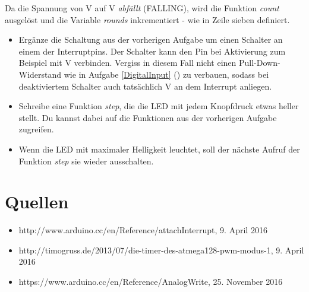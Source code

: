 \documentclass[10pt,a4paper]{article}
\begin{document}
Da die Spannung von \unit[5]{V} auf \unit[0]{V} \emph{abfällt} (FALLING), wird die Funktion \emph{count} ausgelöst und die Variable \emph{rounds} inkrementiert - wie in Zeile sieben definiert.

\begin{itemize}
	\item Ergänze die Schaltung aus der vorherigen Aufgabe um einen Schalter an einem der Interruptpins. Der Schalter kann den Pin bei Aktivierung zum Beispiel mit \unit[5]{V} verbinden. Vergiss in diesem Fall nicht einen Pull-Down-Widerstand wie in Aufgabe \ref{DigitalInput} () zu verbauen, sodass bei deaktiviertem Schalter auch tatsächlich \unit[0]{V} an dem Interrupt anliegen.
	\item Schreibe eine Funktion \textit{step}, die die LED mit jedem Knopfdruck etwas heller stellt. Du kannst dabei auf die Funktionen aus der vorherigen Aufgabe zugreifen.
	\item Wenn die LED mit maximaler Helligkeit leuchtet, soll der nächste Aufruf der Funktion \textit{step} sie wieder ausschalten.
\end{itemize}



%
%
\bigskip
\section*{Quellen}

\begin{itemize}
	\item http://www.arduino.cc/en/Reference/attachInterrupt, 9. April 2016
	\item http://timogruss.de/2013/07/die-timer-des-atmega128-pwm-modus-1, 9. April 2016
	\item https://www.arduino.cc/en/Reference/AnalogWrite, 25. November 2016
\end{itemize}
\end{document}
